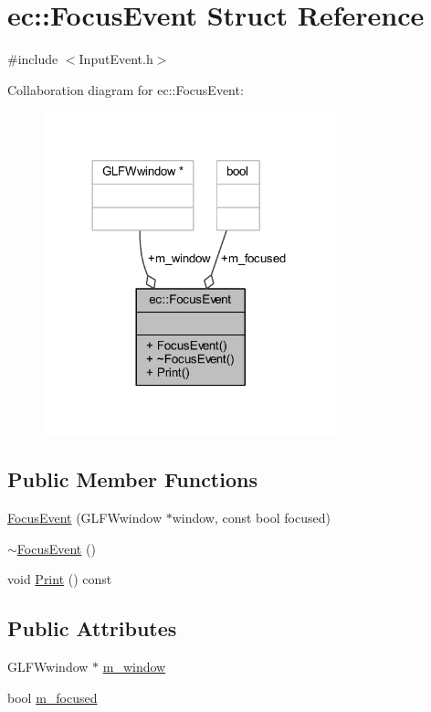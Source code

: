 \hypertarget{structec_1_1_focus_event}{}\section{ec\+:\+:Focus\+Event Struct Reference}
\label{structec_1_1_focus_event}


{\ttfamily \#include $<$Input\+Event.\+h$>$}



Collaboration diagram for ec\+:\+:Focus\+Event\+:\nopagebreak
\begin{figure}[H]
\begin{center}
\leavevmode
\includegraphics[width=240pt]{structec_1_1_focus_event__coll__graph}
\end{center}
\end{figure}
\subsection*{Public Member Functions}
\begin{DoxyCompactItemize}
\item 
\mbox{\hyperlink{structec_1_1_focus_event_ab160b94dd4af651dacdd6049cfdabe0a}{Focus\+Event}} (G\+L\+F\+Wwindow $\ast$window, const bool focused)
\item 
\mbox{\hyperlink{structec_1_1_focus_event_ab59b3bde4ad39accab7fadd830b5f226}{$\sim$\+Focus\+Event}} ()
\item 
void \mbox{\hyperlink{structec_1_1_focus_event_a31a1f08d96f83cbb906f92be18bc8bfb}{Print}} () const
\end{DoxyCompactItemize}
\subsection*{Public Attributes}
\begin{DoxyCompactItemize}
\item 
G\+L\+F\+Wwindow $\ast$ \mbox{\hyperlink{structec_1_1_focus_event_a44db4d7190f7312e23a56cf90c634187}{m\+\_\+window}}
\item 
bool \mbox{\hyperlink{structec_1_1_focus_event_afbca9e2277612590e35c63ef3c445042}{m\+\_\+focused}}
\end{DoxyCompactItemize}


